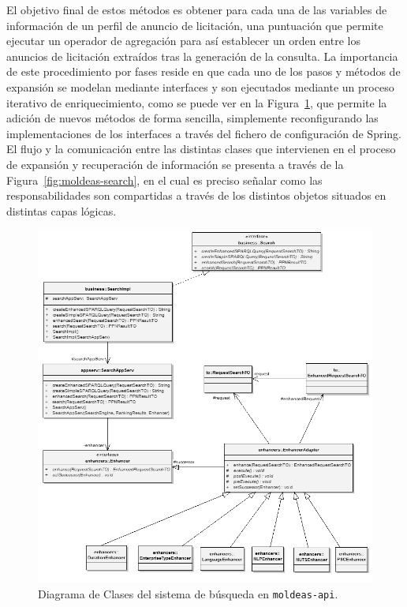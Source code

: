El objetivo final de estos métodos es obtener para cada una de las variables de información de un perfil 
de anuncio de licitación, una puntuación que permite ejecutar un operador de agregación para así establecer 
un orden entre los anuncios de licitación extraídos tras la generación de la consulta. La importancia de este 
procedimiento por fases reside en que cada uno de los pasos y métodos de expansión se modelan mediante interfaces y 
son ejecutados mediante un proceso iterativo de enriquecimiento, como se puede ver en la Figura~\ref{fig:moldeas-api-search}, 
que permite la adición de nuevos métodos de forma sencilla, simplemente reconfigurando las implementaciones de 
los interfaces a través del fichero de configuración de Spring. El flujo y la comunicación 
entre las distintas clases que intervienen en el proceso de expansión y recuperación de información 
se presenta a través de la Figura~\ref{fig:moldeas-search}, en el cual es preciso señalar 
como las responsabilidades son compartidas a través de los distintos objetos situados en distintas 
capas lógicas.

\begin{figure}[!htb]
\centering
	\includegraphics[width=16cm]{images/phd/moldeas/moldeas-chain}
\caption{Diagrama de Clases del sistema de búsqueda en \texttt{moldeas-api}.}
\label{fig:moldeas-api-search}
\end{figure}


